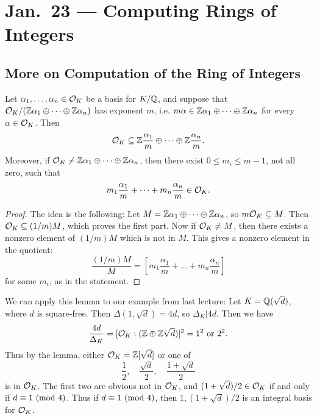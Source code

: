 \chapter{Jan.~23 --- Computing Rings of Integers}

\section{More on Computation of the Ring of Integers}
\begin{lemma}
  Let $\alpha_1, \dots, \alpha_n \in \mathcal{O}_K$ be a
  basis for $K / \mathbb{Q}$, and suppose that
  $\mathcal{O}_K / (\mathbb{Z} \alpha_1 \oplus \dots \oplus \mathbb{Z} \alpha_n)$
  has exponent $m$, i.e. $m \alpha \in \mathbb{Z} \alpha_1 \oplus \dots \oplus \mathbb{Z} \alpha_n$
  for every $\alpha \in \mathcal{O}_K$. Then
  \[
    \mathcal{O}_K \subseteq \mathbb{Z} \frac{\alpha_1}{m} \oplus \dots \oplus \mathbb{Z} \frac{\alpha_n}{m}.
  \]
  Moreover, if $\mathcal{O}_K \ne \mathbb{Z} \alpha_1 \oplus \dots \oplus \mathbb{Z} \alpha_n$,
  then there exist $0 \le m_i \le m - 1$, not all
  zero, such that
  \[
    m_1 \frac{\alpha_1}{m} + \dots + m_n \frac{\alpha_n}{m} \in \mathcal{O}_K.
  \]
\end{lemma}

\begin{proof}
  The idea is the following: Let
  $M = \mathbb{Z} \alpha_1 \oplus \dots \oplus \mathbb{Z} \alpha_n$,
  so $m \mathcal{O}_K \subseteq M$. Then
  $\mathcal{O}_K \subseteq (1 / m) M$, which proves the
  first part. Now if $\mathcal{O}_K \ne M$, then there
  exists a nonzero element of $(1 / m) M$ which is
  not in $M$. This gives a nonzero element in the
  quotient:
  \[
    \frac{(1 / m) M}{M}
    = \left[m_1 \frac{\alpha_1}{m} + \dots + m_n \frac{\alpha_n}{m}\right]
  \]
  for some $m_i$, as in the statement.
\end{proof}

\begin{example}
  We can apply this lemma to our example from last
  lecture: Let $K = \mathbb{Q}(\sqrt{d})$, where
  $d$ is square-free. Then $\Delta(1, \sqrt{d}) = 4d$,
  so $\Delta_K | 4d$. Then we have
  \[
    \frac{4d}{\Delta_K} = [\mathcal{O}_K : (\mathbb{Z} \oplus \mathbb{Z} \sqrt{d})]^2
    = 1^2 \text{ or } 2^2.
  \]
  Thus by the lemma, either $\mathcal{O}_K = \mathbb{Z}[\sqrt{d}]$
  or one of
  \[
    \frac{1}{2}, \quad \frac{\sqrt{d}}{2}, \quad \frac{1 + \sqrt{d}}{2}
  \]
  is in $\mathcal{O}_K$. The first two are obvious not in
  $\mathcal{O}_K$, and $(1 + \sqrt{d}) / 2 \in \mathcal{O}_K$ if
  and only if $d \equiv 1 \ (\mathrm{mod}\ 4)$. Thus if
  $d \equiv 1 \ (\mathrm{mod}\ 4)$, then
  $1, (1 + \sqrt{d}) / 2$ is an integral basis for
  $\mathcal{O}_K$.
\end{example}

